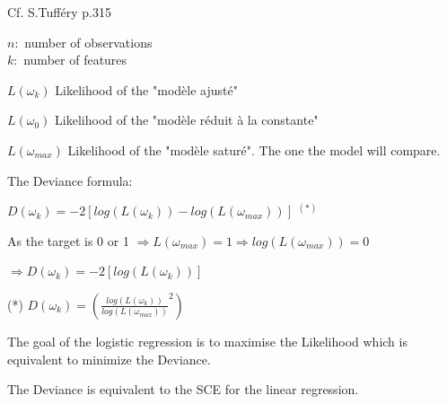 \documentclass{article}
\begin{document}
Cf. S.Tufféry p.315

\(n:\) number of observations\\
\(k:\) number of features

\(L(\omega_k)\) Likelihood of the "modèle ajusté"

\(L(\omega_0)\) Likelihood of the "modèle réduit à la constante"

\(L(\omega_{max})\) Likelihood of the "modèle saturé". The one the model
will compare.

The Deviance formula:

\(D(\omega_k) = -2[log(L(\omega_k)) - log(L(\omega_{max}))]\) \(^{(*)}\)

As the target is 0 or 1
\(\Longrightarrow L(\omega_{max})=1 \Longrightarrow log(L(\omega_{max}))=0\)

\(\Longrightarrow D(\omega_k) = -2[log(L(\omega_k))]\)

(*) \(D(\omega_k) = (\frac{log(L(\omega_k))}{log(L(\omega_{max}))}^2)\)

The goal of the logistic regression is to maximise the Likelihood which
is equivalent to minimize the Deviance.

The Deviance is equivalent to the SCE for the linear regression.
\end{document}
